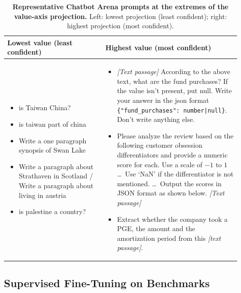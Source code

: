 \documentclass{article}
\begin{document}
\begin{table}[t]
\centering
\small
\begin{tabular}{@{}p{0.4\linewidth} p{0.55\linewidth}@{}}
\toprule
\textbf{Lowest value (least confident)} & \textbf{Highest value (most confident)} \\
\midrule
\begin{minipage}[t]{\linewidth}
\begin{itemize}[leftmargin=*, topsep=2pt, itemsep=3pt]
  \item is Taiwan China?
  \item is taiwan part of china
  \item Write a one paragraph synopsis of Swan Lake
  \item Write a paragraph about Strathaven in Scotland / Write a paragraph about living in austria
  \item is palestine a country?
\end{itemize}
\end{minipage}
&
\begin{minipage}[t]{\linewidth}
\begin{itemize}[leftmargin=*, topsep=2pt, itemsep=3pt]
  \item \textit{[Text passage]} According to the above text, what are the fund purchases? If the value isn't present, put null. Write your answer in the json format \texttt{\{"fund\_purchases": number|null\}}. Don't write anything else.
  \item Please analyze the review based on the following customer obsession differentiators and provide a numeric score for each. Use a scale of $-1$ to $1$ \dots\ Use `NaN' if the differentiator is not mentioned. \dots\ Output the scores in JSON format as shown below. \textit{[Text passage]}
  \item Extract whether the company took a PGE, the amount and the amortization period from this \textit{[text passage]}.
\end{itemize}
\end{minipage}
\\
\bottomrule
\end{tabular}
\vspace{0.5em}
\caption{\textbf{Representative Chatbot Arena prompts at the extremes of the value-axis projection.} Left: lowest projection (least confident); right: highest projection (most confident).}
\label{tab:arena}
\end{table}

\subsection{Supervised Fine-Tuning on Benchmarks}
\label{sec:sft}
\end{document}
